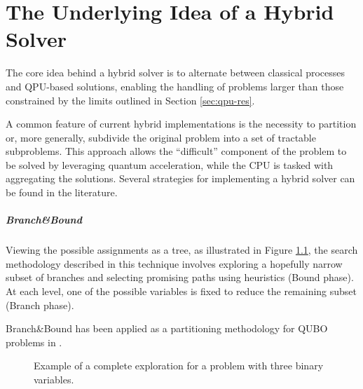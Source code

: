\chapter{The Underlying Idea of a Hybrid Solver}\label{sec:hsolver}

The core idea behind a hybrid solver is to alternate between classical processes and QPU-based solutions, enabling the handling of problems larger than those constrained by the limits outlined in Section \ref{sec:qpu-res}.

A common feature of current hybrid implementations is the necessity to partition or, more generally, subdivide the original problem into a set of tractable subproblems. 
This approach allows the ``difficult'' component of the problem to be solved by leveraging quantum acceleration, while the CPU is tasked with aggregating the solutions.
Several strategies for implementing a hybrid solver can be found in the literature.

\paragraph{Branch\&Bound} Viewing the possible assignments as a tree, as illustrated in Figure \ref{fig:assignment}, the search methodology described in this technique involves exploring a hopefully narrow subset of branches and selecting promising paths using heuristics (Bound phase). 
At each level, one of the possible variables is fixed to reduce the remaining subset (Branch phase).

Branch\&Bound has been applied as a partitioning methodology for QUBO problems in \cite{QBNB}.

\begin{figure}
    \centering
    \caption{Example of a complete exploration for a problem with three binary variables.}
    \label{fig:assignment}
\end{figure}

